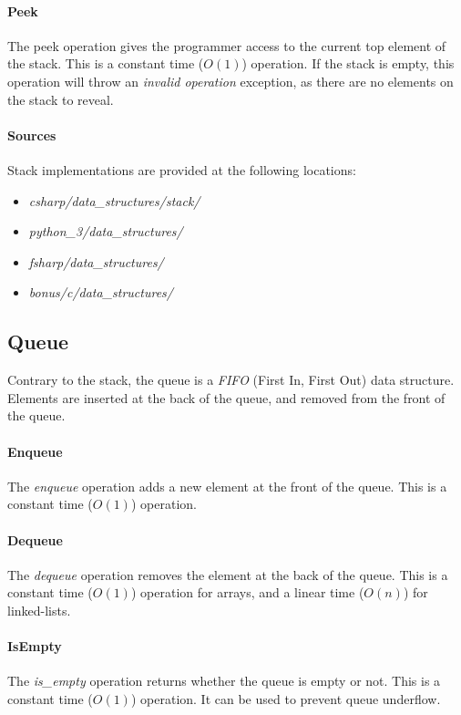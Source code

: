 \documentclass{article}
\begin{document}
\paragraph{Peek}
The peek operation gives the programmer access to the current top element of the stack.
This is a constant time (\(O(1)\)) operation. If the stack is empty, this operation will throw an
{\em invalid operation} exception, as there are no elements on the stack to reveal.

\paragraph{Sources}
Stack implementations are provided at the following locations:
\begin{itemize}
\item{{\em csharp/data\_structures/stack/}}
\item{{\em python\_3/data\_structures/}}
\item{{\em fsharp/data\_structures/}}
\item{{\em bonus/c/data\_structures/}}
\end{itemize}


\newpage


\subsection{Queue}
Contrary to the stack, the queue is a {\em FIFO} (First In, First Out) data structure.
Elements are inserted at the back of the queue, and removed from the front of the queue.

\paragraph{Enqueue}
The {\em enqueue} operation adds a new element at the front of the queue.
This is a constant time (\(O(1)\)) operation.

\paragraph{Dequeue}
The {\em dequeue} operation removes the element at the back of the queue.
This is a constant time (\(O(1)\)) operation for arrays, and a linear time (\(O(n)\)) for linked-lists.

\paragraph{IsEmpty}
The {\em is\_empty} operation returns whether the queue is empty or not.
This is a constant time (\(O(1)\)) operation. It can be used to prevent queue underflow.
\end{document}
